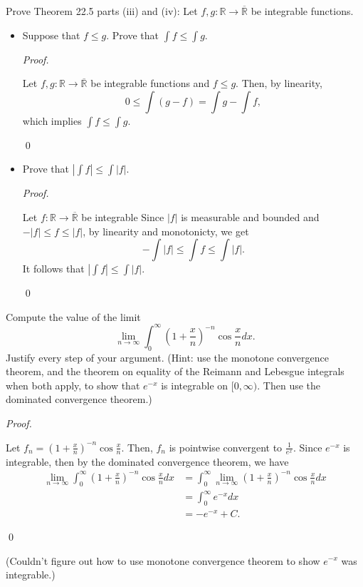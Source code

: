 \documentclass[12pt]{article}
\newenvironment{problem}[2][Problem]{\begin{trivlist}
\item[\hskip \labelsep {\bfseries #1}\hskip \labelsep {\bfseries
#2.}]}{\end{trivlist}}
\newenvironment{sol}
    {\emph{Proof.}
    }
    {
    \qed
    }
\begin{document}
      \begin{problem}{49}
        Prove Theorem 22.5 parts (iii) and (iv): Let $f,g : \mathbb{R} \to \overline{\mathbb{R}}$ be integrable functions.
        \begin{itemize}
          \item[(iii)] Suppose that $f \leq g$. Prove that $\int f \leq \int g$.
          
          \begin{sol}
            Let $f,g : \mathbb{R} \to \overline{\mathbb{R}}$ be integrable functions and $f \leq g$. Then, by linearity, $$0 \leq \int (g - f) = \int g - \int f,$$ which implies $\int f \leq \int g$.
          \end{sol}
        
          \item[(iv)] Prove that $\left| \int f \right| \leq \int | f |$. 
           
          \begin{sol}
            Let $f : \mathbb{R} \to \overline{\mathbb{R}}$ be integrable Since $\left| f \right|$ is measurable and bounded and $-\left|f \right| \leq f \leq \left| f \right|$, by linearity and monotonicty, we get $$- \int \left| f \right| \leq \int f \leq \int \left| f \right|.$$ It follows that $\left| \int f \right| \leq \int | f |$.
          \end{sol} 
        \end{itemize}
        \end{problem}
        
        \begin{problem}{50}
        Compute the value of the limit $$\lim_{n \to \infty} \int_{0}^{\infty}\left( 1 + \frac{x}{n} \right)^{-n}\cos \frac{x}{n}dx.$$ Justify every step of your argument. (Hint: use the monotone convergence theorem, and the theorem on equality of the Reimann and Lebesgue integrals when both apply, to show that $e^{-x}$ is integrable on $[0,\infty)$. Then use the dominated convergence theorem.)
        \end{problem}
        
        \begin{sol}
          Let $f_n = \left( 1 + \frac{x}{n} \right)^{-n}\cos \frac{x}{n}$. Then, $f_n$ is pointwise convergent to $\frac{1}{e^x}$. Since $e^{-x}$ is integrable, then by the dominated convergence theorem, we have 
          \begin{align*}
            \lim_{n \to \infty} \int_{0}^{\infty}\left( 1 + \frac{x}{n} \right)^{-n}\cos \frac{x}{n}dx &= \int_{0}^{\infty} \lim_{n \to \infty} \left( 1 + \frac{x}{n} \right)^{-n}\cos \frac{x}{n}dx \\ &= \int_{0}^{\infty} e^{-x}dx \\ &= -e^{-x} + C.
          \end{align*}
        \end{sol}
        
        \noindent (Couldn't figure out how to use monotone convergence theorem to show $e^{-x}$ was integrable.)
\end{document}
